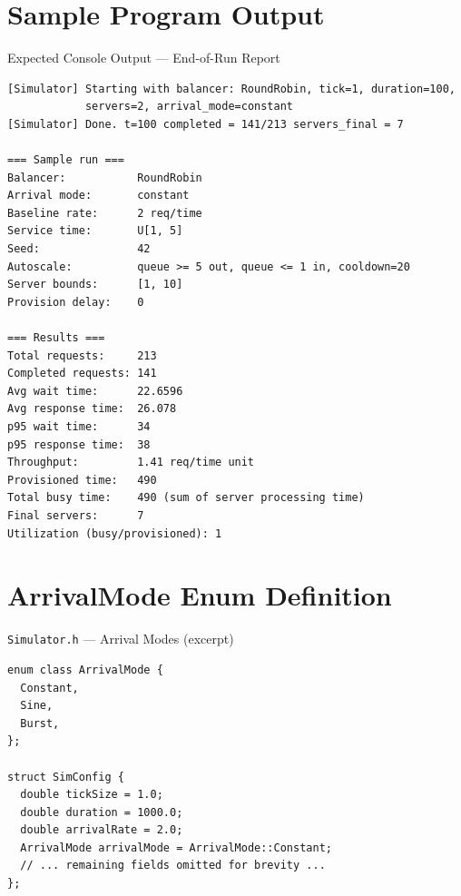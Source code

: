\documentclass[12pt, a4paper]{article}
\newcommand{\code}[1]{\texttt{\textcolor{NUNavyL}{#1}}}
\begin{document}
\appendix
\section{Sample Program Output}

\begin{codebox}[]{Expected Console Output — End-of-Run Report}
\begin{lstlisting}[style=pseudo, numbers=none]
[Simulator] Starting with balancer: RoundRobin, tick=1, duration=100,
            servers=2, arrival_mode=constant
[Simulator] Done. t=100 completed = 141/213 servers_final = 7

=== Sample run ===
Balancer:           RoundRobin
Arrival mode:       constant
Baseline rate:      2 req/time
Service time:       U[1, 5]
Seed:               42
Autoscale:          queue >= 5 out, queue <= 1 in, cooldown=20
Server bounds:      [1, 10]
Provision delay:    0

=== Results ===
Total requests:     213
Completed requests: 141
Avg wait time:      22.6596
Avg response time:  26.078
p95 wait time:      34
p95 response time:  38
Throughput:         1.41 req/time unit
Provisioned time:   490
Total busy time:    490 (sum of server processing time)
Final servers:      7
Utilization (busy/provisioned): 1
\end{lstlisting}
\end{codebox}

\section{ArrivalMode Enum Definition}

\begin{codebox}[]{\code{Simulator.h} — Arrival Modes (excerpt)}
\begin{lstlisting}
enum class ArrivalMode {
  Constant,
  Sine,
  Burst,
};

struct SimConfig {
  double tickSize = 1.0;
  double duration = 1000.0;
  double arrivalRate = 2.0;
  ArrivalMode arrivalMode = ArrivalMode::Constant;
  // ... remaining fields omitted for brevity ...
};
\end{lstlisting}
\end{codebox}
\end{document}
